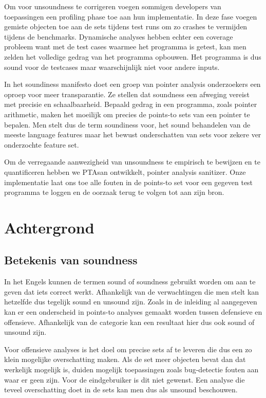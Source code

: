\documentclass[conference]{IEEEtran}
\begin{document}
Om voor unsoundness te corrigeren voegen sommigen developers van toepassingen een profiling phase toe aan hun implementatie\cite{jin_annotating_2022}\cite{kirth_pkru-safe_2022}.
In deze fase voegen gemiste objecten toe aan de sets tijdens test runs om zo crashes te vermijden tijdens de benchmarks. Dynamische analyses hebben echter een coverage probleem 
want met de test cases waarmee het programma is getest, kan men zelden het volledige gedrag van het programma opbouwen. Het programma is dus sound voor de testcases maar 
waarschijnlijk niet voor andere inputs.

In het soundiness manifesto\cite{livshits_defense_2015} doet een groep van pointer analysis onderzoekers een oproep voor meer 
transparantie. Ze stellen dat soundness een afweging vereist met precisie en schaalbaarheid. Bepaald gedrag in een programma, 
zoals pointer arithmetic, maken het moeilijk om precies de points-to sets van een pointer te bepalen. Men stelt dus de term 
soundiness voor, het sound behandelen van de meeste language features maar het bewust onderschatten van sets voor zekere 
ver onderzochte feature set. 

Om de verregaande aanwezigheid van unsoundness te empirisch te bewijzen en te quantificeren hebben we PTAsan ontwikkelt, pointer analysis 
sanitizer. Onze implementatie laat ons toe alle fouten in de points-to set voor een gegeven test programma te loggen en de oorzaak terug 
te volgen tot aan zijn bron. 

\section{Achtergrond}

\subsection{Betekenis van soundness}
In het Engels kunnen de termen sound of soundness gebruikt worden om aan te geven dat iets correct werkt. Afhankelijk van de verwachtingen die men stelt kan hetzelfde dus tegelijk sound en unsound zijn. Zoals in de inleiding al aangegeven kan er een onderscheid in points-to analyses gemaakt worden tussen defensieve en offensieve. Afhankelijk van de categorie kan een resultaat hier dus ook sound of unsound zijn.

Voor offensieve analyses is het doel om precise sets af te leveren die dus een zo klein mogelijke overschatting maken. Als de set meer objecten bevat dan dat werkelijk mogelijk is, duiden mogelijk toepassingen zoals bug-detectie fouten aan waar er geen zijn. Voor de eindgebruiker is dit niet gewenst. Een analyse die teveel overschatting doet in de sets kan men dus als unsound beschouwen.
\end{document}
